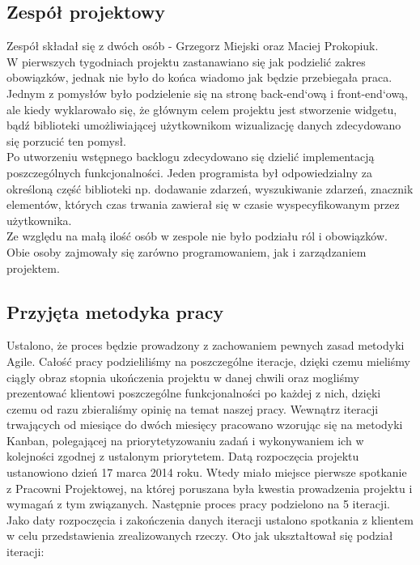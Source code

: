 \documentclass[polish,12pt]{aghthesis}
\begin{document}
\subsection{Zespół projektowy}

Zespół składał się z dwóch osób - Grzegorz Miejski oraz Maciej Prokopiuk.
\\

W pierwszych tygodniach projektu zastanawiano się jak podzielić zakres obowiązków, jednak nie było do końca wiadomo jak będzie przebiegała praca. Jednym z pomysłów było podzielenie się na stronę back-end`ową i front-end`ową, ale kiedy wyklarowało się, że głównym celem projektu jest stworzenie widgetu, bądź biblioteki umożliwiającej użytkownikom wizualizację danych zdecydowano się porzucić ten pomysł. 
\\

Po utworzeniu wstępnego backlogu zdecydowano się dzielić implementacją poszczególnych funkcjonalności. Jeden programista był odpowiedzialny za określoną część biblioteki np. dodawanie zdarzeń, wyszukiwanie zdarzeń, znacznik elementów, których czas trwania zawierał się w czasie wyspecyfikowanym przez użytkownika.
\\

Ze względu na małą ilość osób w zespole nie było podziału ról i obowiązków. Obie osoby zajmowały się zarówno programowaniem, jak i zarządzaniem projektem.  
\\

\subsection{Przyjęta metodyka pracy}

Ustalono, że proces będzie prowadzony z zachowaniem pewnych zasad metodyki Agile. Całość pracy podzieliliśmy na poszczególne iteracje, dzięki czemu mieliśmy ciągly obraz stopnia ukończenia projektu w danej chwili oraz mogliśmy prezentować klientowi poszczególne funkcjonalności po każdej z nich, dzięki czemu od razu zbieraliśmy opinię na temat naszej pracy. Wewnątrz iteracji trwających od miesiące do dwóch miesięcy pracowano wzorując się na metodyki Kanban, polegającej na priorytetyzowaniu zadań i wykonywaniem ich w kolejności zgodnej z ustalonym priorytetem. Datą rozpoczęcia projektu ustanowiono dzień 17 marca 2014 roku. Wtedy miało miejsce pierwsze spotkanie z Pracowni Projektowej, na której poruszana była kwestia prowadzenia projektu i wymagań z tym związanych. Następnie proces pracy podzielono na 5 iteracji. Jako daty rozpoczęcia i zakończenia danych iteracji ustalono spotkania z klientem w celu przedstawienia zrealizowanych rzeczy. Oto jak ukształtował się podział iteracji: \\
\end{document}
